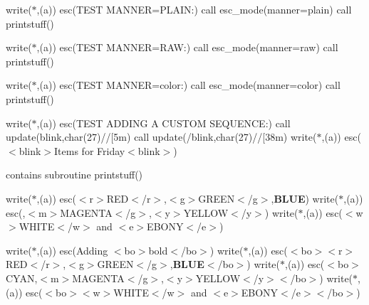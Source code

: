 write($\ast$,\textquotesingle{}(a)\textquotesingle{}) esc(\textquotesingle{}T\+E\+ST M\+A\+N\+N\+ER=P\+L\+A\+IN\+:\textquotesingle{}) call esc\+\_\+mode(manner=\textquotesingle{}plain\textquotesingle{}) call printstuff()

write($\ast$,\textquotesingle{}(a)\textquotesingle{}) esc(\textquotesingle{}T\+E\+ST M\+A\+N\+N\+ER=R\+AW\+:\textquotesingle{}) call esc\+\_\+mode(manner=\textquotesingle{}raw\textquotesingle{}) call printstuff()

write($\ast$,\textquotesingle{}(a)\textquotesingle{}) esc(\textquotesingle{}T\+E\+ST M\+A\+N\+N\+ER=color\+:\textquotesingle{}) call esc\+\_\+mode(manner=\textquotesingle{}color\textquotesingle{}) call printstuff()

write($\ast$,\textquotesingle{}(a)\textquotesingle{}) esc(\textquotesingle{}T\+E\+ST A\+D\+D\+I\+NG A C\+U\+S\+T\+OM S\+E\+Q\+U\+E\+N\+CE\+:\textquotesingle{}) call update(\textquotesingle{}blink\textquotesingle{},char(27)//\textquotesingle{}\mbox{[}5m\textquotesingle{}) call update(\textquotesingle{}/blink\textquotesingle{},char(27)//\textquotesingle{}\mbox{[}38m\textquotesingle{}) write($\ast$,\textquotesingle{}(a)\textquotesingle{}) esc(\textquotesingle{}$<$blink$>$Items for Friday$<$blink$>$\textquotesingle{})

contains subroutine printstuff()

write($\ast$,\textquotesingle{}(a)\textquotesingle{}) esc(\textquotesingle{}$<$r$>$R\+ED$<$/r$>$,$<$g$>$G\+R\+E\+EN$<$/g$>$,{\bfseries B\+L\+UE}\textquotesingle{}) write($\ast$,\textquotesingle{}(a)\textquotesingle{}) esc(,$<$m$>$M\+A\+G\+E\+N\+TA$<$/g$>$,$<$y$>$Y\+E\+L\+L\+OW$<$/y$>$\textquotesingle{}) write($\ast$,\textquotesingle{}(a)\textquotesingle{}) esc(\textquotesingle{}$<$w$>$W\+H\+I\+TE$<$/w$>$ and $<$e$>$E\+B\+O\+NY$<$/e$>$\textquotesingle{})

write($\ast$,\textquotesingle{}(a)\textquotesingle{}) esc(\textquotesingle{}Adding $<$bo$>$bold$<$/bo$>$\textquotesingle{}) write($\ast$,\textquotesingle{}(a)\textquotesingle{}) esc(\textquotesingle{}$<$bo$>$$<$r$>$R\+ED$<$/r$>$,$<$g$>$G\+R\+E\+EN$<$/g$>$,{\bfseries B\+L\+UE}$<$/bo$>$\textquotesingle{}) write($\ast$,\textquotesingle{}(a)\textquotesingle{}) esc(\textquotesingle{}$<$bo$>${\ttfamily C\+Y\+AN},$<$m$>$M\+A\+G\+E\+N\+TA$<$/g$>$,$<$y$>$Y\+E\+L\+L\+OW$<$/y$>$$<$/bo$>$\textquotesingle{}) write($\ast$,\textquotesingle{}(a)\textquotesingle{}) esc(\textquotesingle{}$<$bo$>$$<$w$>$W\+H\+I\+TE$<$/w$>$ and $<$e$>$E\+B\+O\+NY$<$/e$>$$<$/bo$>$\textquotesingle{})

